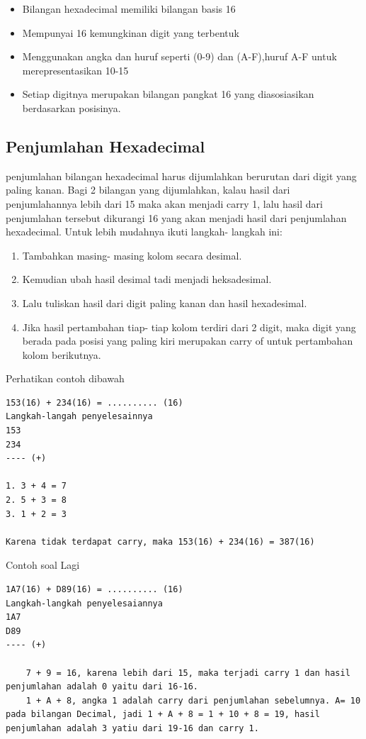 	\begin{itemize}
		\item Bilangan hexadecimal memiliki bilangan basis 16
		\item Mempunyai 16 kemungkinan digit yang terbentuk
		\item Menggunakan angka dan huruf seperti (0-9) dan (A-F),huruf A-F untuk merepresentasikan 10-15
		\item Setiap digitnya merupakan bilangan pangkat 16 yang diasosiasikan berdasarkan posisinya.
	\end{itemize}

	\subsection {Penjumlahan Hexadecimal}
penjumlahan bilangan hexadecimal harus dijumlahkan berurutan dari digit yang paling kanan. Bagi 2 bilangan yang dijumlahkan, kalau hasil dari penjumlahannya lebih dari 15 maka akan menjadi carry 1, lalu hasil dari penjumlahan tersebut dikurangi 16 yang akan menjadi hasil dari penjumlahan hexadecimal.
Untuk lebih mudahnya ikuti langkah- langkah ini:
		\begin{enumerate}
			\item Tambahkan masing- masing kolom secara desimal.
			\item Kemudian ubah hasil desimal tadi menjadi heksadesimal.
			\item Lalu tuliskan hasil dari digit paling kanan dan hasil hexadesimal.
			\item Jika hasil pertambahan tiap- tiap kolom terdiri dari 2 digit, maka digit yang berada pada posisi yang paling kiri merupakan carry of untuk pertambahan kolom berikutnya.
		\end{enumerate}
			
Perhatikan contoh dibawah
\begin{verbatim}
153(16) + 234(16) = .......... (16) 
Langkah-langah penyelesainnya
153 
234 
---- (+)

1. 3 + 4 = 7
2. 5 + 3 = 8
3. 1 + 2 = 3

Karena tidak terdapat carry, maka 153(16) + 234(16) = 387(16)
\end{verbatim}
Contoh soal Lagi 
\begin{verbatim}
1A7(16) + D89(16) = .......... (16)
Langkah-langkah penyelesaiannya
1A7
D89
---- (+)

	7 + 9 = 16, karena lebih dari 15, maka terjadi carry 1 dan hasil penjumlahan adalah 0 yaitu dari 16-16.
	1 + A + 8, angka 1 adalah carry dari penjumlahan sebelumnya. A= 10 pada bilangan Decimal, jadi 1 + A + 8 = 1 + 10 + 8 = 19, hasil penjumlahan adalah 3 yatiu dari 19-16 dan carry 1.
\end{verbatim}

